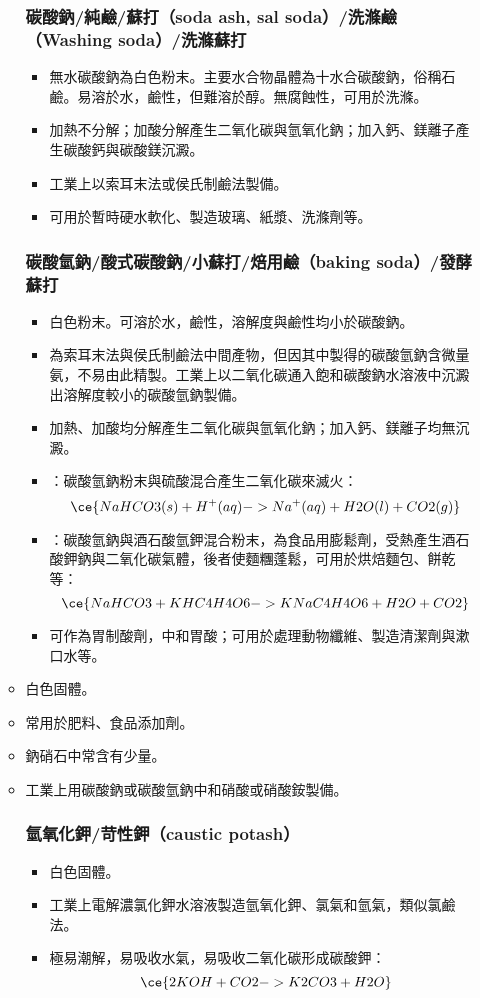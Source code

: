 \documentclass[a4paper,12pt]{report}
\begin{document}
\begin{itemize}
\begin{itemize}
\subsubsection{碳酸鈉/純鹼/蘇打（soda ash, sal soda）/洗滌鹼（Washing soda）/洗滌蘇打}
\begin{itemize}
\item 無水碳酸鈉為白色粉末。主要水合物晶體為十水合碳酸鈉，俗稱石鹼。易溶於水，鹼性，但難溶於醇。無腐蝕性，可用於洗滌。
\item 加熱不分解；加酸分解產生二氧化碳與氫氧化鈉；加入鈣、鎂離子產生碳酸鈣與碳酸鎂沉澱。
\item 工業上以索耳末法或侯氏制鹼法製備。
\item 可用於暫時硬水軟化、製造玻璃、紙漿、洗滌劑等。
\end{itemize}
\subsubsection{碳酸氫鈉/酸式碳酸鈉/小蘇打/焙用鹼（baking soda）/發酵蘇打}
\begin{itemize}
\item 白色粉末。可溶於水，鹼性，溶解度與鹼性均小於碳酸鈉。
\item 為索耳末法與侯氏制鹼法中間產物，但因其中製得的碳酸氫鈉含微量氨，不易由此精製。工業上以二氧化碳通入飽和碳酸鈉水溶液中沉澱出溶解度較小的碳酸氫鈉製備。
\item 加熱、加酸均分解產生二氧化碳與氫氧化鈉；加入鈣、鎂離子均無沉澱。
\item {}：碳酸氫鈉粉末與硫酸混合產生二氧化碳來滅火：
\[\ce{NaHCO3(s) + H^+(aq) -> Na^+(aq) + H2O(l) + CO2(g)}\]
\item {}：碳酸氫鈉與酒石酸氫鉀混合粉末，為食品用膨鬆劑，受熱產生酒石酸鉀鈉與二氧化碳氣體，後者使麵糰蓬鬆，可用於烘焙麵包、餅乾等：
\[\ce{NaHCO3 + KHC4H4O6 -> KNaC4H4O6 + H2O + CO2}\]
\item 可作為胃制酸劑，中和胃酸；可用於處理動物纖維、製造清潔劑與漱口水等。
\end{itemize}
\bit
\item 白色固體。
\item 常用於肥料、食品添加劑。
\item 鈉硝石中常含有少量。
\item 工業上用碳酸鈉或碳酸氫鈉中和硝酸或硝酸銨製備。
\eit
\subsubsection{氫氧化鉀/苛性鉀（caustic potash）}
\begin{itemize}
\item 白色固體。
\item 工業上電解濃氯化鉀水溶液製造氫氧化鉀、氯氣和氫氣，類似氯鹼法。
\item 極易潮解，易吸收水氣，易吸收二氧化碳形成碳酸鉀：
\[\ce{2KOH + CO2 -> K2CO3 + H2O}\]
\end{itemize}

\end{itemize}
\end{itemize}
\end{document}
